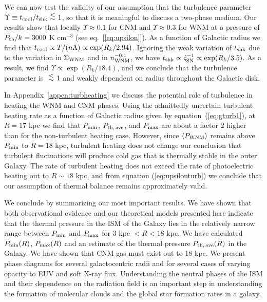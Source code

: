 \documentclass[12pt,preprint,flushrt]{aastex}
\newcommand{\pmax}{P_{\rm max}}
\newcommand{\pmin}{P_{\rm min}}
\newcommand{\al}{\mbox{ \raisebox{-.4ex}{$\stackrel{\textstyle <}{\sim}$} }}
\begin{document}
We can now test the validity of our assumption
that the turbulence parameter $\Upsilon\equiv t_{\rm cool}/
t_{\rm shk}\al 1$, so that it
is meaningful to discuss a two-phase medium.
Our results show that locally $\Upsilon \approx 0.1$ for CNM and
$\Upsilon \approx 0.3$ for WNM at a pressure of $P_{\rm th}/k = 3000$
K cm$^{-3}$ (see eq.~[\ref{eq:upsilon}]). As a function of Galactic 
radius we find that
$t_{\rm cool}\propto T/(n\Lambda)\propto\exp(R_k/2.94)$.
Ignoring the
weak variation of $t_{\rm shk}$ due to the variation
in $\Sigma_{\rm WNM}$ and in $n_{\rm WNM}^{-0.1}$, we
have $t_{\rm shk}\propto\dot\varsigma_{\rm SN}^{-1}
\propto \exp(R_k/3.5)$.  As a result, we
find $\Upsilon \propto \exp(R_k/18.4)$, and we conclude
that the turbulence parameter is $\al 1$  and weakly 
dependent on  radius throughout the Galactic disk.

In Appendix~\ref{appen:turbheating} we discuss the potential role
of turbulence in heating the WNM and CNM phases. Using the
admittedly uncertain turbulent heating rate as a function of Galactic radius
given by equation~(\ref{eq:gturb1}), at $R=17$ kpc  we find that
 $P_{\rm min}$, $P_{\rm th,\, ave}$, and $P_{\rm max}$ are about a factor
2 higher than for the non-turbulent heating case.
However,
since $\langle P_{\rm WNM} \rangle$ remains above $P_{\rm min}$ to
$R = 18$ kpc, turbulent heating does not change our conclusion
that turbulent fluctuations will produce
cold gas that is thermally stable in the outer Galaxy. The rate of
turbulent heating does not exceed the rate of
photoelectric heating out to $R\sim 18$ kpc, and from equation 
(\ref{eq:upsilonturb})
we conclude that our assumption of thermal balance remains
approximately valid.

We conclude by summarizing our most important results. We have shown
that both observational evidence and our theoretical models
presented here indicate that the thermal pressure in the ISM of
the Galaxy lies in the relatively narrow range between
$\pmin$ and $\pmax$ for 3 kpc $< R < 18$ kpc. We have calculated
$\pmin (R)$, $\pmax (R)$ and an estimate of the thermal pressure
$P_{\rm th,\,ave}(R)$ in the Galaxy. We have shown that CNM gas must
exist out to 18 kpc. We present phase diagrams for several galactocentric
radii and for several cases of varying opacity to EUV and soft X-ray
flux. Understanding the neutral phases of the ISM and their dependence
on the radiation field is an important step in understanding the formation
of molecular clouds and the global star formation rates in a galaxy.
\end{document}
